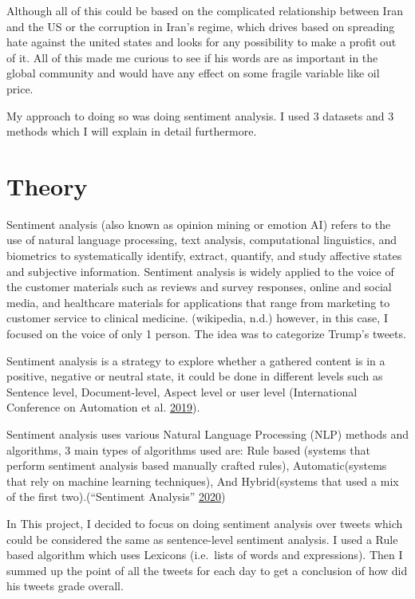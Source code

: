 \documentclass[]{article}
\begin{document}
Although all of this could be based on the complicated relationship
between Iran and the US or the corruption in Iran's regime, which drives
based on spreading hate against the united states and looks for any
possibility to make a profit out of it. All of this made me curious to
see if his words are as important in the global community and would have
any effect on some fragile variable like oil price.

My approach to doing so was doing sentiment analysis. I used 3 datasets
and 3 methods which I will explain in detail furthermore.

\section{Theory}\label{theory}

Sentiment analysis (also known as opinion mining or emotion AI) refers
to the use of natural language processing, text analysis, computational
linguistics, and biometrics to systematically identify, extract,
quantify, and study affective states and subjective information.
Sentiment analysis is widely applied to the voice of the customer
materials such as reviews and survey responses, online and social media,
and healthcare materials for applications that range from marketing to
customer service to clinical medicine. (wikipedia, n.d.) however, in
this case, I focused on the voice of only 1 person. The idea was to
categorize Trump's tweets.

Sentiment analysis is a strategy to explore whether a gathered content
is in a positive, negative or neutral state, it could be done in
different levels such as Sentence level, Document-level, Aspect level or
user level (International Conference on Automation et al.
\protect\hyperlink{ref-international_conference_on_automation_abstract_2019}{2019}).

Sentiment analysis uses various Natural Language Processing (NLP)
methods and algorithms, 3 main types of algorithms used are: Rule based
(systems that perform sentiment analysis based manually crafted rules),
Automatic(systems that rely on machine learning techniques), And
Hybrid(systems that used a mix of the first two).(``Sentiment Analysis''
\protect\hyperlink{ref-noauthor_sentiment_2020}{2020})

In This project, I decided to focus on doing sentiment analysis over
tweets which could be considered the same as sentence-level sentiment
analysis. I used a Rule based algorithm which uses Lexicons (i.e.~lists
of words and expressions). Then I summed up the point of all the tweets
for each day to get a conclusion of how did his tweets grade overall.
\end{document}
